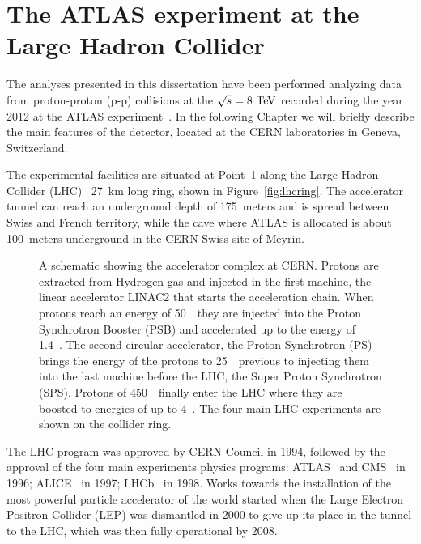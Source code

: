 \clearpage{\pagestyle{empty}\cleardoublepage}

\chapter{The ATLAS experiment at the Large Hadron Collider}\label{chap:atlas}

The analyses presented in this dissertation have been performed analyzing data from 
proton-proton (p-p) collisions at the \cme $\rts=8\tev$ recorded during the year 2012 
at the ATLAS experiment~\cite{Aad:2008zzm}. In the following Chapter we will briefly 
describe the main features of the detector, located at the CERN laboratories in Geneva,
Switzerland.

The experimental facilities are situated at Point~1 along the Large Hadron Collider 
(LHC)~\cite{lhc} 27~km long ring, shown in Figure~\ref{fig:lhcring}. The accelerator
tunnel can reach an underground depth of 175~meters and is spread between Swiss
and French territory, while the cave where ATLAS is allocated is about 100~meters 
underground in the CERN Swiss site of Meyrin. 

\begin{figure}[tb]\begin{center}
	\caption{A schematic showing the accelerator complex at CERN. Protons are
        extracted from Hydrogen gas and injected in the first machine, the linear 
        accelerator LINAC2 that starts the acceleration chain. When protons reach
        an energy of 50~\mev\ they are injected into the Proton Synchrotron Booster
        (PSB) and accelerated up to the energy of 1.4~\gev. The second circular
        accelerator, the Proton Synchrotron (PS) brings the energy of the protons
        to 25~\gev\ previous to injecting them into the last machine before the LHC,
        the Super Proton Synchrotron (SPS). Protons of 450~\gev\ finally enter the
        LHC where they are boosted to energies of up to 4~\tev.
        The four main LHC experiments are shown on the collider ring.}
\end{center}\end{figure}

The LHC program was approved by CERN Council in 1994, followed by the approval of
the four main experiments physics programs: ATLAS~\cite{Aad:2008zzm} and CMS~\cite{cms}
in 1996; ALICE~\cite{alice} in 1997; LHCb~\cite{lhcb} in 1998.
Works towards the installation of the most powerful particle accelerator of the world
started when the Large Electron Positron Collider (LEP) was dismantled in 2000 to 
give up its place in the tunnel to the LHC, which was then fully operational by 2008.


